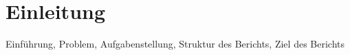 \section{Einleitung}

Einführung, Problem, Aufgabenstellung, Struktur des Berichts, Ziel des Berichts
